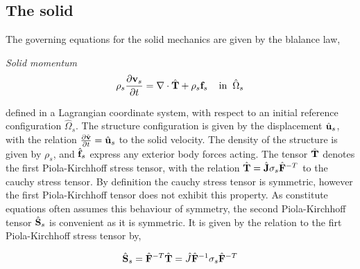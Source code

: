 \subsection{The solid}
The governing equations for the solid mechanics are given by the blalance law,
\begin{equat}
\textit{Solid momentum}
\begin{align}
\rho_s \frac{\partial \mathbf{v}_s}{\partial t} = \nabla \cdot \hat{\mathbf{T}} + \rho_s \mathbf{f}_s
\hspace{4mm} \text{in} \hspace{2mm} \hat{\Omega}_s
\end{align}
\end{equat}
defined in a Lagrangian coordinate system, with respect to an initial reference configuration $\hat{\Omega}_s$. The structure configuration is given by the displacement $\hat{\mathbf{u}}_s$, with the relation
 $\frac{\partial \hat{\mathbf{v}}}{\partial t} = \hat{\mathbf{u}}_s$ to the solid velocity. The density of the structure is given by $\rho_s$, and $\hat{\mathbf{f}}_s$ express any exterior body forces acting. The tensor $\hat{\mathbf{T}}$ denotes the first Piola-Kirchhoff stress tensor, with the relation $\hat{\mathbf{T}}  = \hat{\mathbf{J}} \sigma_s \hat{\mathbf{F}}^{-T}$ to the cauchy stress tensor. By definition the cauchy stress tensor is symmetric, however the first Piola-Kirchhoff tensor does not exhibit this property. As constitute equations often assumes this behaviour of symmetry, the second Piola-Kirchhoff tensor $\hat{\mathbf{S}}_s$ is convenient as it is symmetric.  It is given by the relation to the firt Piola-Kirchhoff stress tensor by, 
 
 \begin{align*}
 \hat{\mathbf{S}}_s = \hat{\mathbf{F}}^{-T} \hat{\mathbf{T}} = \hat{J} \hat{\mathbf{F}}^{-1} \sigma_s \hat{\mathbf{F}}^{-T}
 \end{align*}
 
